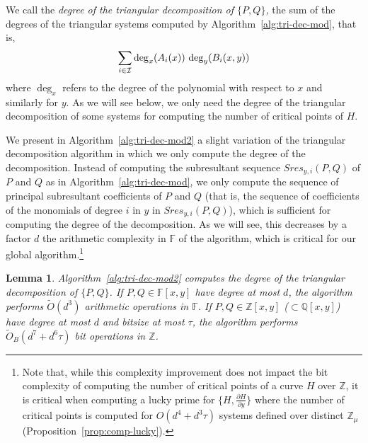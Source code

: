 \documentclass{sig-alternate}
\newtheorem{lemma}[theorem]{Lemma}
\newcommand {\Z}   {\mathbb Z}
\newcommand{\sO}{\ensuremath{\widetilde{{O}}}}
\newcommand{\sOB}{\ensuremath{\widetilde{{O}}_B}}
\begin{document}
\smallskip
{}\quad
We call the \emph{degree of the triangular decomposition of $\{P,Q\}$,} 
the sum of the degrees of the triangular systems computed
by Algorithm~\ref{alg:tri-dec-mod}, that is,
\[\sum_{i\in\cal I}{\deg_x(A_i(x))\,\deg_y(B_i(x,y))}\] where $\deg_x$ refers to the degree of the
polynomial with respect to $x$ and similarly for $y$.
As we will see below, we only need the degree of the  triangular decomposition of some systems for computing the
number of critical points of $H$. 

We present in Algorithm~\ref{alg:tri-dec-mod2}  a slight variation of the triangular
decomposition algorithm in which we only compute the degree of the decomposition. 
Instead of computing the subresultant sequence $Sres_{y,i}(P,Q)$ of
$P$ and $Q$ as in Algorithm~\ref{alg:tri-dec-mod}, we only compute  the sequence of principal
subresultant coefficients of
$P$ and $Q$ (that is, the sequence of coefficients of the monomials of degree $i$ in $y$ in
$Sres_{y,i}(P,Q)$), which is sufficient for computing the degree of the decomposition. As we will
see, this decreases by a factor $d$  the arithmetic complexity in $\mathbb{F}$ of the algorithm, which is
critical for our global algorithm.\footnote{\small Note that, while  this complexity improvement does not
impact the bit complexity of computing the number of critical points of a curve $H$ over $\Z$, it is
critical when computing a lucky prime for $\{H,\frac{\partial H}{\partial y}\}$ where the number
of critical points is computed for $O(d^4+d^3\tau)$ systems defined over distinct  $\Z_\mu$  (Proposition~\ref{prop:comp-lucky}).}



\begin{lemma}\label{lem:tridec_pair}
Algorithm~\ref{alg:tri-dec-mod2} computes the degree of the triangular decomposition of $\{P,Q\}$.
If $P, Q\in\mathbb{F}[x,y]$ have degree at most $d$, the algorithm performs $\sO(d^3)$ arithmetic
operations in $\mathbb{F}$. If 
$P,Q\in\mathbb{Z}[x,y]$ ($\subset\mathbb{Q}[x,y]$) have degree at most $d$ and bitsize at most $\tau$,
the algorithm performs $\sOB(d^7+d^6\tau)$ bit 
operations in $\mathbb{Z}$. 
\end{lemma}
\end{document}
